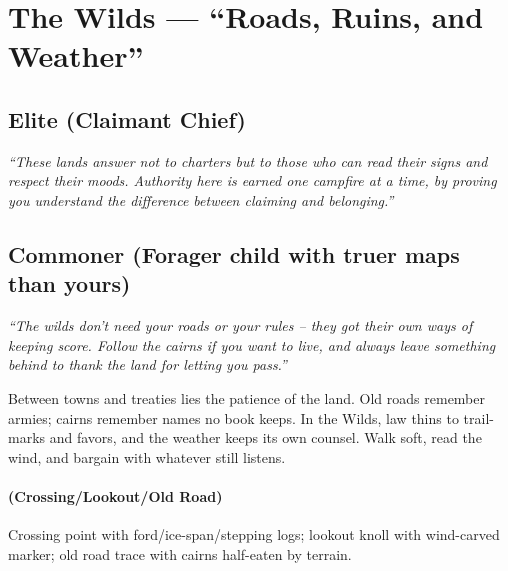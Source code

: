 \section{The Wilds --- ``Roads, Ruins, and Weather''}
\label{chap:wilderness}

\subsection*{Elite (Claimant Chief)}
\textit{``These lands answer not to charters but to those who can read their signs and respect their moods. Authority here is earned one campfire at a time, by proving you understand the difference between claiming and belonging.''}

\subsection*{Commoner (Forager child with truer maps than yours)}
\textit{``The wilds don't need your roads or your rules – they got their own ways of keeping score. Follow the cairns if you want to live, and always leave something behind to thank the land for letting you pass.''}

\begin{tcolorbox}[colback=black!3,colframe=black!40!white,title={Theme \& Atmosphere}]
Between towns and treaties lies the patience of the land. Old roads remember armies; cairns remember names no book keeps. In the Wilds, law thins to trail-marks and favors, and the weather keeps its own counsel. Walk soft, read the wind, and bargain with whatever still listens.
\end{tcolorbox}

\paragraph*{(Crossing/Lookout/Old Road)} Crossing point with ford/ice-span/stepping logs; lookout knoll with wind-carved marker; old road trace with cairns half-eaten by terrain.

